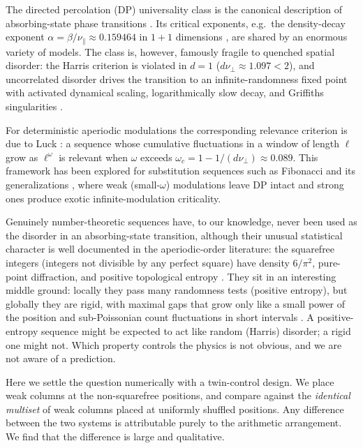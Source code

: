 \documentclass[aps,pre,twocolumn,superscriptaddress,nofootinbib]{revtex4-2}
\begin{document}
The directed percolation (DP) universality class is the canonical description of absorbing-state
phase transitions \cite{Hinrichsen2000,Janssen1981,Grassberger1982}. Its critical exponents,
e.g.\ the density-decay exponent $\alpha = \beta/\nu_\parallel \approx 0.159464$ in $1{+}1$
dimensions \cite{Jensen1999}, are shared by an enormous variety of models. The class is,
however, famously fragile to quenched spatial disorder: the Harris criterion
\cite{Harris1974} is violated in $d=1$ ($d\nu_\perp \approx 1.097 < 2$), and uncorrelated
disorder drives the transition to an infinite-randomness fixed point with activated dynamical
scaling, logarithmically slow decay, and Griffiths singularities
\cite{Hooyberghs2003,Vojta2006}.

For deterministic aperiodic modulations the corresponding relevance criterion is due to Luck
\cite{Luck1993}: a sequence whose cumulative fluctuations in a window of length $\ell$ grow
as $\ell^{\omega}$ is relevant when $\omega$ exceeds
$\omega_c = 1 - 1/(d\nu_\perp) \approx 0.089$. This framework has been explored for
substitution sequences such as Fibonacci and its generalizations
\cite{BarghathiNozadzeVojta2014}, where weak (small-$\omega$) modulations leave DP intact
and strong ones produce exotic infinite-modulation criticality.

Genuinely number-theoretic sequences have, to our knowledge, never been used as the disorder
in an absorbing-state transition, although their unusual statistical character is well
documented in the aperiodic-order literature: the squarefree integers (integers not divisible
by any perfect square) have density $6/\pi^2$, pure-point diffraction, and positive
topological entropy \cite{BaakeMoodyPleasants2000,Sarnak2011}. They sit in an interesting
middle ground: locally they pass many randomness tests (positive entropy), but globally they
are rigid, with maximal gaps that grow only like a small power of the position
\cite{FilasetaTrifonov1992} and sub-Poissonian count fluctuations in short intervals
\cite{Hall1982}. A positive-entropy sequence might be expected to act like random (Harris)
disorder; a rigid one might not. Which property controls the physics is not obvious, and we
are not aware of a prediction.

Here we settle the question numerically with a twin-control design. We place weak columns at
the non-squarefree positions, and compare against the \emph{identical multiset} of weak
columns placed at uniformly shuffled positions. Any difference between the two systems is
attributable purely to the arithmetic arrangement. We find that the difference is large and
qualitative.
\end{document}
